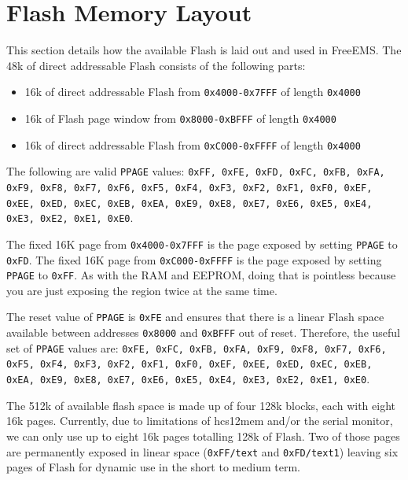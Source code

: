 \documentclass[12pt,a4paper,titlepage]{article}
\begin{document}
\section{Flash Memory Layout}

This section details how the available Flash is laid out and used in FreeEMS.
The 48k of direct addressable Flash consists of the following parts:

\begin{itemize}
\item 16k of direct addressable Flash from \texttt{0x4000-0x7FFF}
of length \texttt{0x4000}

\item 16k of Flash page window from \texttt{0x8000-0xBFFF} of
length \texttt{0x4000}

\item 16k of direct addressable Flash from \texttt{0xC000-0xFFFF}
of length \texttt{0x4000}
\end{itemize}

The following are valid \texttt{PPAGE} values: \texttt{0xFF, 0xFE, 0xFD, 0xFC,
0xFB, 0xFA, 0xF9, 0xF8, 0xF7, 0xF6, 0xF5, 0xF4, 0xF3, 0xF2, 0xF1, 0xF0, 0xEF,
0xEE, 0xED, 0xEC, 0xEB, 0xEA, 0xE9, 0xE8, 0xE7, 0xE6, 0xE5, 0xE4, 0xE3, 0xE2,
0xE1, 0xE0}.

The fixed 16K page from \texttt{0x4000-0x7FFF} is the page exposed by setting
\texttt{PPAGE} to \texttt{0xFD}. The fixed 16K page from \texttt{0xC000-0xFFFF}
is the page exposed by setting \texttt{PPAGE} to \texttt{0xFF}. As with the RAM
and EEPROM, doing that is pointless because you are just exposing the region
twice at the same time.

The reset value of \texttt{PPAGE} is \texttt{0xFE} and ensures that there
is a linear Flash space available between addresses \texttt{0x8000} and
\texttt{0xBFFF} out of reset. Therefore, the useful set of \texttt{PPAGE}
values are: \texttt{0xFE, 0xFC, 0xFB, 0xFA, 0xF9, 0xF8, 0xF7, 0xF6, 0xF5, 0xF4,
0xF3, 0xF2, 0xF1, 0xF0, 0xEF, 0xEE, 0xED, 0xEC, 0xEB, 0xEA, 0xE9, 0xE8, 0xE7,
0xE6, 0xE5, 0xE4, 0xE3, 0xE2, 0xE1, 0xE0}.

The 512k of available flash space is made up of four 128k blocks, each with
eight 16k pages. Currently, due to limitations of hcs12mem and/or the serial
monitor, we can only use up to eight 16k pages totalling 128k of Flash. Two of
those pages are permanently exposed in linear space (\texttt{0xFF/text} and
\texttt{0xFD/text1}) leaving six pages of Flash for dynamic use in the short to
medium term.
\end{document}
